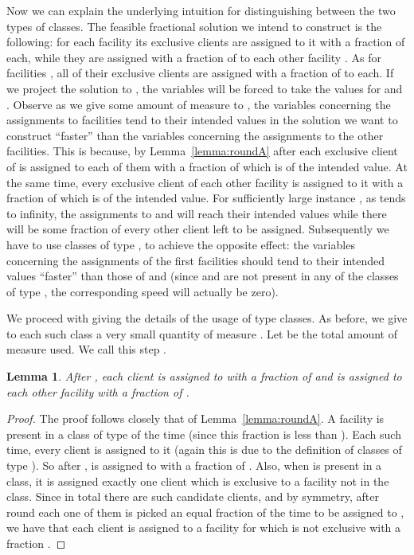 \documentclass[11pt]{article}\usepackage{amsmath}
\newtheorem{lemma}{Lemma}[section]
\begin{document}
Now we can explain the underlying intuition for distinguishing between
the two
types of classes.  The feasible fractional solution 
we  intend to  construct is  the following:  for each
facility  its exclusive clients are assigned to it with
a fraction of  each, while they are assigned with a
fraction of  to  each other facility . As  for facilities  , all  of their exclusive  clients are
assigned with a fraction of   to each.  If  we  project  the solution  to  
 , the  variables will be forced 
to  take   the  values
 for  and . Observe as we give some  amount of  measure to  ,
 the  variables  concerning the
assignments to facilities  tend to their intended values in the
solution we want to construct ``faster'' than the variables concerning the
assignments to the other facilities. This is because, by Lemma~\ref{lemma:roundA}
after  each exclusive client  of  is assigned to each of them with
a fraction of  which is  of  the intended value. At the  same time, every
exclusive  client of  each other  facility is  assigned to  it  with a
fraction of  which is   of the  intended value.  For sufficiently
large  instance  ,  as    tends  to  infinity,  the  assignments
to  and  will reach their intended values while there will
be   some    fraction   of   every    other   client   left    to   be
assigned. Subsequently we have to use classes of type , 
to achieve the opposite effect: the
variables  concerning the  assignments of  the first   facilities
should tend
to their intended values ``faster''  than those of  and  (since
 and   are 
not  present in  any of  the classes  of type  ,  the corresponding
speed will actually be zero).

We  proceed  with  giving  the  details  of  the  usage  of  type  
classes. As before,  we give to each such class  a very small quantity
of  measure .  Let    be the  total  amount of  measure
used. We call this step .

\begin{lemma}   \label{lemma:roundB}
After  ,  each client      is
assigned  to   with a  fraction of    and is
assigned to each other  facility    with a
fraction of .
\end{lemma}


\begin{proof}
The proof  follows closely that of  Lemma~\ref{lemma:roundA}. A  facility   is present in  a class of  type    of the
time (since   this  fraction is less  than ).  Each such
time, every  client  is  assigned to  it (again
this  is due  to the  definition  of classes  of type  ). So  after
,      is  assigned   to      with   a  fraction   of
.  
Also, when   is  present  in a  class, it is assigned exactly one client
which is exclusive to a facility
not in the class. Since in total there are  such candidate clients,
and by symmetry, after round  
each one of them is picked an equal fraction of the time to
be assigned to , we have that
each client  is assigned to a facility for which  is not
exclusive with  a fraction
.
\end{proof}
\end{document}
